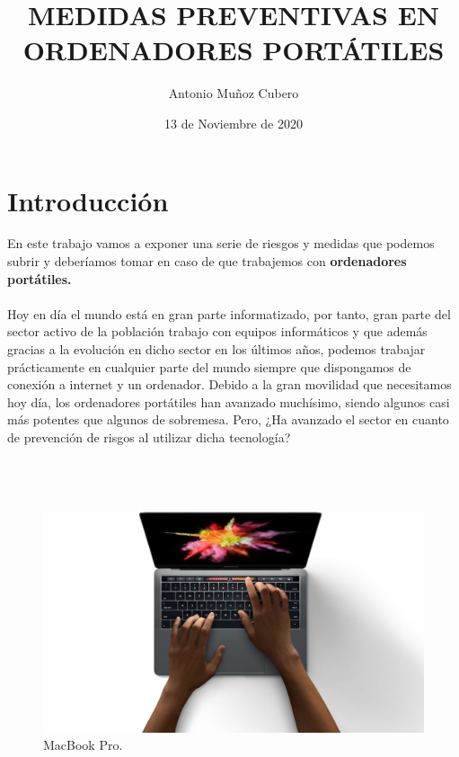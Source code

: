 \documentclass{article}
\title{MEDIDAS PREVENTIVAS EN ORDENADORES PORTÁTILES}
\author{Antonio Muñoz Cubero}
\date{13 de Noviembre de 2020}
\begin{document}
  \maketitle 
      \pagestyle{fancy}
  
  \newpage
    \tableofcontents
  
  \newpage

  \newpage
    \section{Introducción} %
      En este trabajo vamos a exponer una serie de riesgos y medidas que podemos subrir y deberíamos tomar en caso de que trabajemos con \textbf{ordenadores portátiles.}
      \\\\
      Hoy en día el mundo está en gran parte informatizado, por tanto, gran parte del sector activo de la población trabajo con equipos informáticos y que además gracias a la 
      evolución en dicho sector en los últimos años, podemos trabajar prácticamente en cualquier parte del mundo siempre que dispongamos de conexión a internet y un ordenador.
      Debido a la gran movilidad que necesitamos hoy día, los ordenadores portátiles han avanzado muchísimo, siendo algunos casi más potentes que algunos de sobremesa. Pero, ¿Ha 
      avanzado el sector en cuanto de prevención de risgos al utilizar dicha tecnología?
      \\\\\\\\
      \begin{figure}[h] 
        \centering
        \includegraphics[scale = 0.5]{img/macbook.jpg}
        \caption{MacBook Pro.}
      \end{figure}
  \newpage
\end{document}

